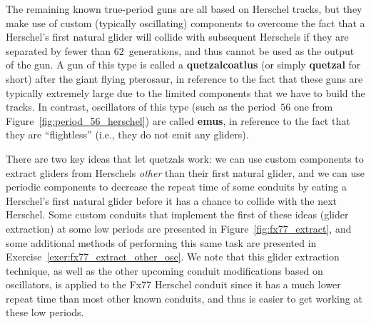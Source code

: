 The remaining known true-period guns are all based on Herschel tracks, but they make use of custom (typically oscillating) components to overcome the fact that a Herschel's first natural glider will collide with subsequent Herschels if they are separated by fewer than $62$~generations, and thus cannot be used as the output of the gun. A gun of this type is called a \textbf{quetzalcoatlus} (or simply \textbf{quetzal} for short) after the giant flying pterosaur, in reference to the fact that these guns are typically extremely large due to the limited components that we have to build the tracks. In contrast, oscillators of this type (such as the period~$56$ one from Figure~\ref{fig:period_56_herschel}) are called \textbf{emus}, in reference to the fact that they are ``flightless'' (i.e., they do not emit any gliders).

There are two key ideas that let quetzals work: we can use custom components to extract gliders from Herschels \emph{other} than their first natural glider, and we can use periodic components to decrease the repeat time of some conduits by eating a Herschel's first natural glider before it has a chance to collide with the next Herschel. Some custom conduits that implement the first of these ideas (glider extraction) at some low periods are presented in Figure~\ref{fig:fx77_extract}, and some additional methods of performing this same task are presented in Exercise~\ref{exer:fx77_extract_other_osc}. We note that this glider extraction technique, as well as the other upcoming conduit modifications based on oscillators, is applied to the Fx77 Herschel conduit since it has a much lower repeat time than most other known conduits, and thus is easier to get working at these low periods.

